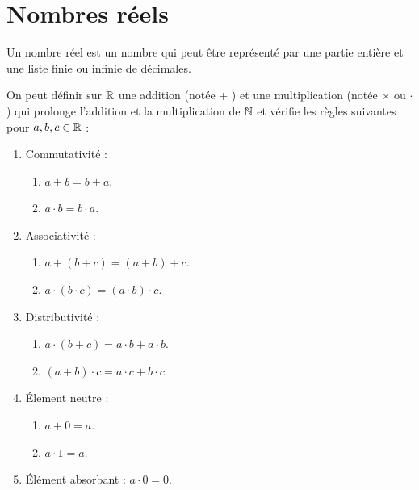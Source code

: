 \chapter{Nombres réels}\label{chap:nb_reels}
\def\arraystretch{1}

\begin{definition}
    Un nombre réel est un nombre qui peut être représenté par une partie entière et une liste finie ou infinie de décimales.
\end{definition}

\begin{proposition}
    On peut définir sur $\mathbb{R}$ une addition (notée \og + \fg) et une multiplication (notée \og $\times$ \fg ou \og $\cdot$ \fg) qui prolonge l'addition et la multiplication de $\mathbb{N}$ et vérifie les règles suivantes pour $a, b, c \in \mathbb{R}$ :
    \begin{enumerate}
        \item Commutativité : 
        \begin{enumerate}
        	\item $a + b = b + a$.
        	\item $a \cdot b = b \cdot a$.
        \end{enumerate}
        \item Associativité : 
        \begin{enumerate}
        	\item $a + (b + c) = (a + b) + c$.
        	\item $a \cdot (b \cdot c) = (a \cdot b) \cdot c$.
        \end{enumerate}
        \item Distributivité : 
		\begin{enumerate}
			\item $a \cdot (b + c) = a \cdot b + a \cdot b$.
			\item $(a + b) \cdot c = a \cdot c + b \cdot c$.
		\end{enumerate}
        \item \'Element neutre :
        \begin{enumerate}
        	\item $a + 0 = a$.
        	\item $a \cdot 1 = a$.
        \end{enumerate}
        \item \'Elément absorbant : $a \cdot 0 = 0$.
    \end{enumerate}
\end{proposition}

